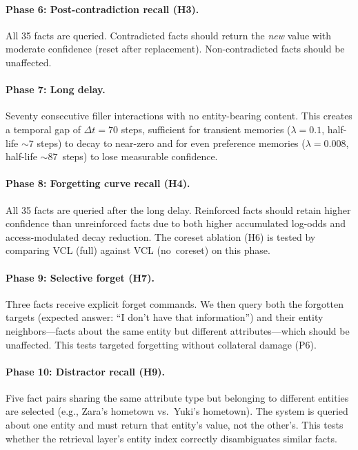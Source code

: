 \paragraph{Phase 6: Post-contradiction recall (H3).}
All 35 facts are queried. Contradicted facts should return the \emph{new} value with moderate confidence (reset after replacement). Non-contradicted facts should be unaffected.

\paragraph{Phase 7: Long delay.}
Seventy consecutive filler interactions with no entity-bearing content. This creates a temporal gap of $\Delta t = 70$ steps, sufficient for transient memories ($\lambda = 0.1$, half-life ${\sim}7$ steps) to decay to near-zero and for even preference memories ($\lambda = 0.008$, half-life ${\sim}87$~steps) to lose measurable confidence.

\paragraph{Phase 8: Forgetting curve recall (H4).}
All 35 facts are queried after the long delay. Reinforced facts should retain higher confidence than unreinforced facts due to both higher accumulated log-odds and access-modulated decay reduction. The coreset ablation (H6) is tested by comparing VCL (full) against VCL (no~coreset) on this phase.

\paragraph{Phase 9: Selective forget (H7).}
Three facts receive explicit forget commands. We then query both the forgotten targets (expected answer: ``I don't have that information'') and their entity neighbors---facts about the same entity but different attributes---which should be unaffected. This tests targeted forgetting without collateral damage (P6).

\paragraph{Phase 10: Distractor recall (H9).}
Five fact pairs sharing the same attribute type but belonging to different entities are selected (e.g., Zara's hometown vs.\ Yuki's hometown). The system is queried about one entity and must return that entity's value, not the other's. This tests whether the retrieval layer's entity index correctly disambiguates similar facts.



